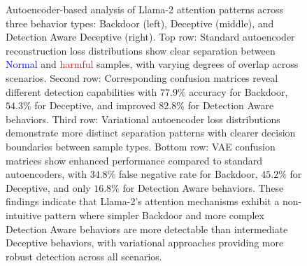 \begin{figure}[htbp]
    \caption{\small{Autoencoder-based analysis of Llama-2 attention patterns across three behavior types: Backdoor (left), Deceptive (middle), and Detection Aware Deceptive (right). Top row: Standard autoencoder reconstruction loss distributions show clear separation between \textcolor{Blue}{Normal} and \textcolor{Red}{harmful} samples, with varying degrees of overlap across scenarios. Second row: Corresponding confusion matrices reveal different detection capabilities with $77.9\%$ accuracy for Backdoor, $54.3\%$ for Deceptive, and improved $82.8\%$ for Detection Aware behaviors. Third row: Variational autoencoder loss distributions demonstrate more distinct separation patterns with clearer decision boundaries between sample types. Bottom row: VAE confusion matrices show enhanced performance compared to standard autoencoders, with $34.8\%$ false negative rate for Backdoor, $45.2\%$ for Deceptive, and only $16.8\%$ for Detection Aware behaviors. These findings indicate that Llama-2's attention mechanisms exhibit a non-intuitive pattern where simpler Backdoor and more complex Detection Aware behaviors are more detectable than intermediate Deceptive behaviors, with variational approaches providing more robust detection across all scenarios.}}
    

\end{figure}





